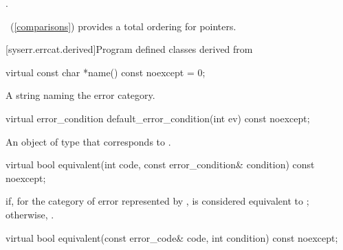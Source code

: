 \begin{itemdescr}
\pnum
\returns {}.

\enternote {}~(\ref{comparisons}) provides a total ordering for pointers. \exitnote
\end{itemdescr}

[syserr.errcat.derived]{Program defined classes derived from }

\begin{itemdecl}
virtual const char *name() const noexcept = 0;
\end{itemdecl}

\begin{itemdescr}
\pnum
\returns A string naming the error category.
\end{itemdescr}

\begin{itemdecl}
virtual error_condition default_error_condition(int ev) const noexcept;
\end{itemdecl}

\begin{itemdescr}
\pnum
\returns An object of type  that corresponds to .
\end{itemdescr}

\begin{itemdecl}
virtual bool equivalent(int code, const error_condition& condition) const noexcept;
\end{itemdecl}

\begin{itemdescr}
\pnum
\returns {} if, for the category of error represented by ,  is considered equivalent to ; otherwise, .
\end{itemdescr}

\begin{itemdecl}
virtual bool equivalent(const error_code& code, int condition) const noexcept;
\end{itemdecl}

